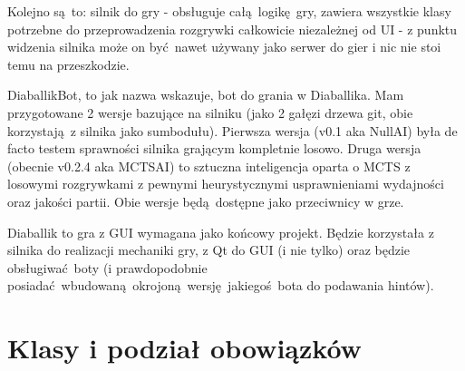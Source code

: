 \documentclass[a4paper,12pt]{article}
\begin{document}
Kolejno są to: silnik do gry - obsługuje całą logikę gry, zawiera wszystkie klasy potrzebne do przeprowadzenia rozgrywki całkowicie
niezależnej od UI - z punktu widzenia silnika może on być nawet używany jako serwer do gier i nic nie stoi temu na przeszkodzie. 

DiaballikBot, to jak nazwa wskazuje, bot do grania w Diaballika. Mam przygotowane 2 wersje bazujące na silniku (jako 2 gałęzi drzewa git, obie 
korzystają z silnika jako sumbodułu). Pierwsza wersja (v0.1 aka NullAI) była de facto testem sprawności silnika grającym kompletnie losowo. 
Druga wersja (obecnie v0.2.4 aka MCTSAI) to sztuczna inteligencja oparta o MCTS z losowymi rozgrywkami z pewnymi heurystycznymi usprawnieniami 
wydajności oraz jakości partii. Obie wersje będą dostępne jako przeciwnicy w grze.

Diaballik to gra z GUI wymagana jako końcowy projekt. Będzie korzystała z silnika do realizacji mechaniki gry, z Qt do GUI (i nie tylko) oraz będzie
obsługiwać boty (i prawdopodobnie posiadać wbudowaną okrojoną wersję jakiegoś bota do podawania hintów).

\section{Klasy i podział obowiązków}
\end{document}
